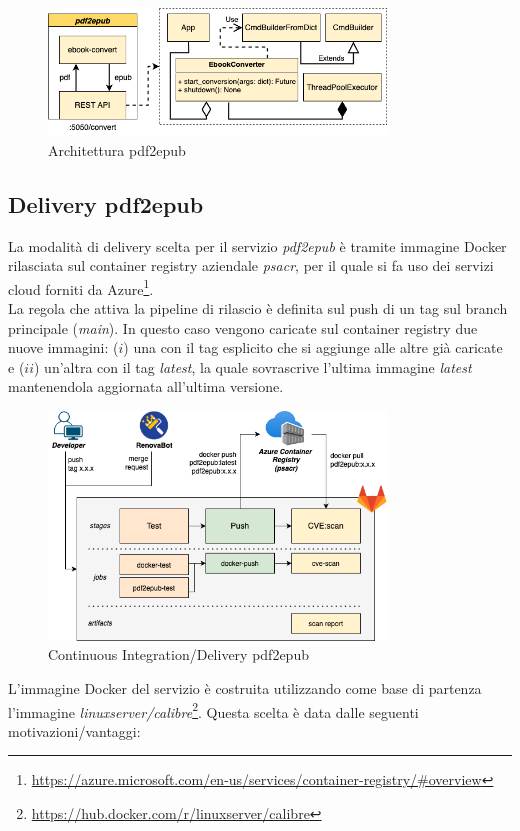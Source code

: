 \begin{figure}[H]
\centering
\includegraphics[width=0.8\textwidth]{img/tesi-Page-19.drawio.png}
\caption{Architettura pdf2epub}
\end{figure}

\subsection{Delivery pdf2epub}
La modalità di delivery scelta per il servizio \textit{pdf2epub} è tramite immagine Docker rilasciata sul container registry aziendale \textit{psacr}, per il quale si fa uso dei servizi cloud forniti da Azure\footnote{\url{https://azure.microsoft.com/en-us/services/container-registry/\#overview}}.\\
La regola che attiva la pipeline di rilascio è definita sul push di un tag sul branch principale (\textit{main}). In questo caso vengono caricate sul container registry due nuove immagini: ($i$) una con il tag esplicito che si aggiunge alle altre già caricate e ($ii$) un'altra con il tag \textit{latest}, la quale sovrascrive l'ultima immagine \textit{latest} mantenendola aggiornata all'ultima versione.
\begin{figure}[H]
\centering
\includegraphics[width=0.8\textwidth]{img/tesi-6-pdf2epub.drawio.png}
\caption{Continuous Integration/Delivery pdf2epub}
\end{figure}
L'immagine Docker del servizio è costruita utilizzando come base di partenza l'immagine \textit{linuxserver/calibre}\footnote{\url{https://hub.docker.com/r/linuxserver/calibre}}. Questa scelta è data dalle seguenti motivazioni/vantaggi:
